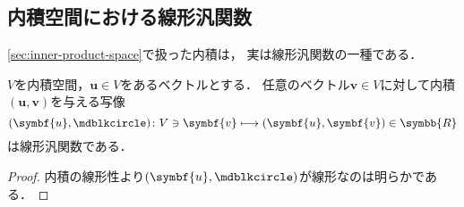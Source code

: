 \documentclass[../sotsu.tex]{subfiles}
\begin{document}
\subsection{内積空間における線形汎関数}

\cref{sec:inner-product-space}で扱った内積は，
実は線形汎関数の一種である．

\begin{proposition}
    $V$を内積空間，$\symbf{u} \in V$をあるベクトルとする．
    任意のベクトル$\symbf{v} \in V$に対して内積$(\symbf{u}, \symbf{v})$を与える写像
    \begin{equation}
        (\symbf{u}, \bigdot) \colon V \ni \symbf{v} \longmapsto (\symbf{u}, \symbf{v}) \in \symbb{R}
    \end{equation}
    は線形汎関数である．
\end{proposition}

\begin{proof}
    内積の線形性より$(\symbf{u}, \bigdot)$が線形なのは明らかである．
\end{proof}
\end{document}
